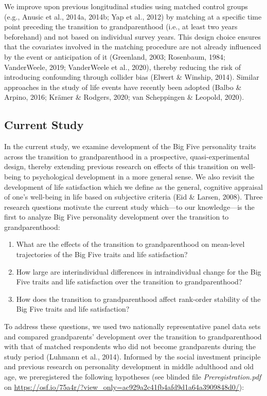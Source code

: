 \documentclass[
  english,
  man, noextraspace]{apa7}
\providecommand{\tightlist}{%
  \setlength{\itemsep}{0pt}\setlength{\parskip}{0pt}}
\begin{document}
We improve upon previous longitudinal studies using matched control groups (e.g., Anusic et al., 2014a, 2014b; Yap et al., 2012) by matching at a specific time point preceding the transition to grandparenthood (i.e., at least two years beforehand) and not based on individual survey years. This design choice ensures that the covariates involved in the matching procedure are not already influenced by the event or anticipation of it (Greenland, 2003; Rosenbaum, 1984; VanderWeele, 2019; VanderWeele et al., 2020), thereby reducing the risk of introducing confounding through collider bias (Elwert \& Winship, 2014). Similar approaches in the study of life events have recently been adopted (Balbo \& Arpino, 2016; Krämer \& Rodgers, 2020; van Scheppingen \& Leopold, 2020).

\hypertarget{current-study}{%
\subsection{Current Study}\label{current-study}}

In the current study, we examine development of the Big Five personality traits across the transition to grandparenthood in a prospective, quasi-experimental design, thereby extending previous research on effects of this transition on well-being to psychological development in a more general sense. We also revisit the development of life satisfaction which we define as the general, cognitive appraisal of one's well-being in life based on subjective criteria (Eid \& Larsen, 2008). Three research questions motivate the current study which---to our knowledge---is the first to analyze Big Five personality development over the transition to grandparenthood:

\begin{enumerate}
\def\labelenumi{\arabic{enumi}.}
\tightlist
\item
  What are the effects of the transition to grandparenthood on mean-level trajectories of the Big Five traits and life satisfaction?
\item
  How large are interindividual differences in intraindividual change for the Big Five traits and life satisfaction over the transition to grandparenthood?
\item
  How does the transition to grandparenthood affect rank-order stability of the Big Five traits and life satisfaction?
\end{enumerate}

To address these questions, we used two nationally representative panel data sets and compared grandparents' development over the transition to grandparenthood with that of matched respondents who did not become grandparents during the study period (Luhmann et al., 2014). Informed by the social investment principle and previous research on personality development in middle adulthood and old age, we preregistered the following hypotheses (see blinded file \emph{Preregistration.pdf} on \url{https://osf.io/75a4r/?view_only=ac929a2c41fb4afd9d1a64a3909848d0/}):
\end{document}
